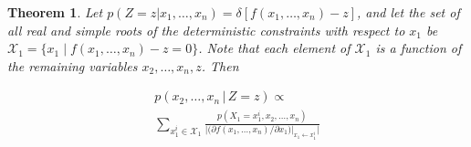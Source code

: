 \documentclass{article}
\newtheorem{theorem}{Theorem}
\newcommand{\pr}{p}
\begin{document}
\begin{theorem} 
\label{theorem1}
Let {\footnotesize $\pr(Z\!=\!z | x_1, \ldots, x_n) = \delta[f(x_1, \ldots, x_n)-z]$}, and
let the set of all real and simple roots of the deterministic constraints with respect to $x_1$ be
$ \mathcal{X}_1 = \{ x_1 \; | \; f(x_1, \ldots, x_n) - z = 0 \} $. Note that each element of $ \mathcal{X}_1 $
is a function of the remaining variables $ x_2,\dots,x_n,z $.
Then  

\begin{multline}
\label{e:theorem1}
p(x_2, \ldots, x_n \,|\, Z=z) \propto \\
\sum_{x_1^i \in \mathcal{X}_1} 
\frac{p(X_1=x_1^i, x_2, \ldots, x_n)}
{\Big|\big(\partial f(x_1, \ldots, x_n) / \partial x_1 \big)|_{x_1 \leftarrow x_1^i} \Big|}
\end{multline}
\end{theorem}
\end{document}
